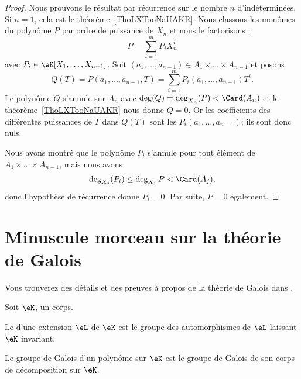\begin{proof}
	Nous prouvons le résultat par récurrence sur le nombre \( n\) d'indéterminées. Si \( n=1\), cela est le théorème~\ref{ThoLXTooNaUAKR}. Nous classons les monômes du polynôme \( P\) par ordre de puissance de \( X_n\) et nous le factorisons :
	\begin{equation}
		P=\sum_{i=1}^mP_iX_n^i
	\end{equation}
	avec \( P_i\in \eK[X_1,\ldots, X_{n-1}]\). Soit \( (a_1,\ldots, a_{n-1})\in A_1\times \ldots \times A_{n-1}\) et posons
	\begin{equation}
		Q(T)=P(a_1,\ldots, a_{n-1},T)= \sum_{i=1}^mP_i(a_1,\ldots, a_{n-1})T^i.
	\end{equation}
	Le polynôme \( Q\) s'annule sur \( A_n\) avec \( \deg(Q)=\deg_{X_n}(P)<\Card(A_n)\) et le théorème~\ref{ThoLXTooNaUAKR} nous donne \( Q=0\). Or les coefficients des différentes puissances de \( T\) dans \( Q(T) \) sont les \( P_i(a_1,\ldots, a_{n-1})\); ils sont donc nuls.

	Nous avons montré que le polynôme \( P_i\) s'annule pour tout élément de \( A_1\times \ldots \times A_{n-1}\), mais nous avons
	\begin{equation}
		\deg_{X_j}(P_i)\leq \deg_{X_j}P<\Card(A_j),
	\end{equation}
	donc l'hypothèse de récurrence donne \( P_i=0\). Par suite, \( P=0\) également.
\end{proof}




\section{Minuscule morceau sur la théorie de Galois}

Vous trouverez des détails et des preuves à propos de la théorie de Galois dans \cite{GalIEl,rqrNyg}.

\begin{definition}
	Soit \( \eK\), un corps.

	Le  d'une extension \( \eL\) de \( \eK\) est le groupe des automorphismes de \( \eL\) laissant \( \eK\) invariant.

	Le groupe de Galois d'un polynôme sur \( \eK\) est le groupe de Galois de son corps de décomposition sur \( \eK\).
\end{definition}


